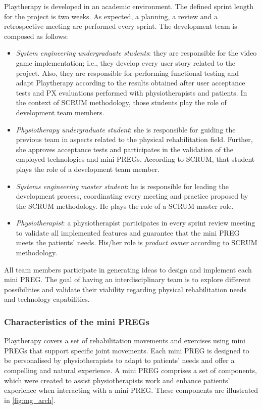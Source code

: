 Playtherapy is developed in an academic environment. The defined sprint length for the project is two weeks. As expected, a planning, a review and a retrospective meeting are performed every sprint. The development team is composed as follows:
\begin{itemize}
    \item \emph{System engineering undergraduate students}: they are responsible for the video game implementation; i.e., they develop every user story related to the project. Also, they are responsible for performing functional testing and adapt Playtherapy according to the results obtained after user acceptance tests and \ac{PX} evaluations performed with physiotherapists and patients. In the context of SCRUM methodology, those students play the role of development team members.
    \item \emph{Physiotherapy undergraduate student}: she is responsible for guiding the previous team in aspects related to the physical rehabilitation field. Further, she approves acceptance tests and participates in the validation of the employed technologies and mini \acp{PREG}. According to SCRUM, that student plays the role of a development team member.
    \item \emph{Systems engineering master student}: he is responsible for leading the development process, coordinating every meeting and practice proposed by the SCRUM methodology. He plays the role of a SCRUM master role.
    \item \emph{Physiotherapist}: a physiotherapist participates in every sprint review meeting to validate all implemented features and guarantee that the mini \ac{PREG} meets the patients' needs. His/her role is \textit{product owner} according to SCRUM methodology.
\end{itemize}

All team members participate in generating ideas to design and implement each mini \ac{PREG}. The goal of having an interdisciplinary team is to explore different possibilities and validate their viability regarding physical rehabilitation needs and technology capabilities.

\subsubsection{Characteristics of the mini \acp{PREG}}
Playtherapy covers a set of rehabilitation movements and exercises using mini \acp{PREG} that support specific joint movements. Each mini \ac{PREG} is designed to be personalised by physiotherapists to adapt to patients' needs and offer a compelling and natural experience. A mini \ac{PREG} comprises a set of components, which were created to assist physiotherapists work and enhance patients' experience when interacting with a mini \ac{PREG}. These components are illustrated in \autoref{fig:mg_arch}.

